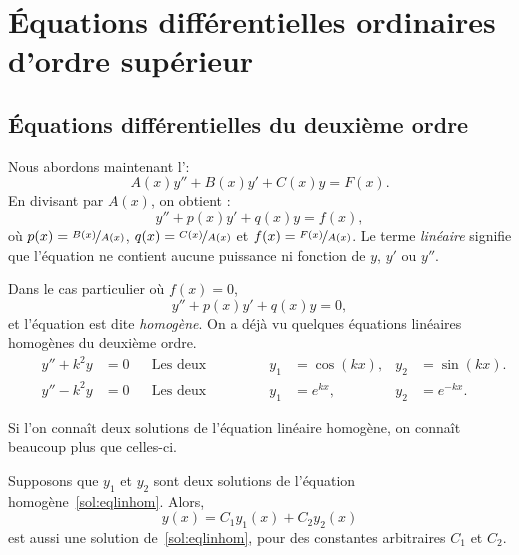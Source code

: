 \chapter{Équations différentielles ordinaires d'ordre supérieur} \label{ho:chapter}


\section{Équations différentielles du deuxième ordre}
\label{solinear:section}


Nous abordons maintenant l'\emph{}:
\begin{equation*}
	A(x) y'' + B(x)y' + C(x)y = F(x) .
\end{equation*}
En divisant par $A(x)$, on obtient : 
\begin{equation} \label{sol:eqlin}
	y'' + p(x)y' + q(x)y = f(x) ,
\end{equation}
où $p(x) = \nicefrac{B(x)}{A(x)}$, $q(x) = \nicefrac{C(x)}{A(x)}$ 
et $f(x) = \nicefrac{F(x)}{A(x)}$.
Le terme \emph{linéaire} signifie que l'équation ne contient aucune puissance ni fonction de $y$, $y'$ ou $y''$.

Dans le cas particulier où $f(x) = 0$,
\begin{equation} \label{sol:eqlinhom}
	y'' + p(x)y' + q(x)y = 0 ,
\end{equation}
et l'équation est dite \emph{homogène}. 
On a déjà vu quelques équations linéaires homogènes du deuxième ordre.
\begin{align*}
	\qquad y'' + k^2 y & = 0 &
	& \text{Les deux solutions sont:} & y_1 &= \cos (kx), & y_2 &= \sin(kx) . \\
	\qquad y'' - k^2 y & = 0 &
	& \text{Les deux solutions sont:} &y_1 &= e^{kx}, & y_2 &= e^{-kx} . 
\end{align*}

Si l'on connaît deux solutions de l'équation linéaire homogène, on connaît beaucoup plus que celles-ci.

\begin{theorem}[Superposition]
	Supposons que $y_1$ et $y_2$ sont deux solutions de l'équation homogène~\eqref{sol:eqlinhom}.  
	Alors,
	\begin{equation*}
		y(x) = C_1 y_1(x) + C_2 y_2(x) 
	\end{equation*}
	est aussi une solution de~\eqref{sol:eqlinhom}, pour des constantes arbitraires $C_1$ et $C_2$.
\end{theorem}

